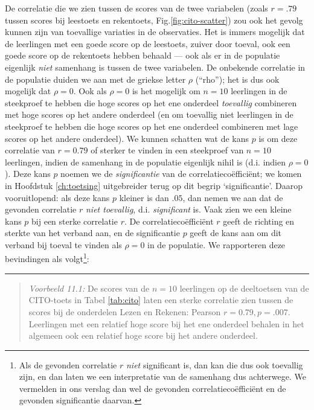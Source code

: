 \documentclass[
]{book}
\begin{document}
De correlatie die we zien tussen de scores van de twee variabelen (zoals
\(r=.79\) tussen scores bij leestoets en rekentoets,
Fig.\ref{fig:cito-scatter}) zou ook het gevolg kunnen zijn van
toevallige variaties in de observaties. Het is immers mogelijk dat de
leerlingen met een goede score op de leestoets, zuiver door toeval, ook
een goede score op de rekentoets hebben behaald --- ook als er in de
populatie eigenlijk \emph{niet} samenhang is tussen de twee variabelen. De
onbekende correlatie in de populatie duiden we aan met de griekse letter
\(\rho\) (``rho''); het is dus ook mogelijk dat \(\rho=0\). Ook als \(\rho=0\)
is het mogelijk om \(n=10\) leerlingen in de steekproef te hebben die hoge
scores op het ene onderdeel \emph{toevallig} combineren met hoge scores op
het andere onderdeel (en om toevallig niet leerlingen in de steekproef
te hebben die hoge scores op het ene onderdeel combineren met lage
scores op het andere onderdeel). We kunnen schatten wat de kans \(p\) is
om deze correlatie van \(r=0.79\) of sterker te vinden in een steekproef
van \(n=10\) leerlingen, indien de samenhang in de populatie eigenlijk
nihil is (d.i. indien \(\rho=0\)). Deze kans \(p\) noemen we de
\emph{significantie} van de correlatiecoëfficiënt; we komen in
Hoofdstuk \ref{ch:toetsing} uitgebreider terug op dit begrip
`significantie'. Daarop vooruitlopend: als deze kans \(p\) kleiner is dan
\(.05\), dan nemen we aan dat de gevonden correlatie \(r\) \emph{niet toevallig},
d.i. \emph{significant} is. Vaak zien we een kleine kans \(p\) bij een sterke
correlatie \(r\). De correlatiecoëfficiënt \(r\) geeft de richting en
sterkte van het verband aan, en de significantie \(p\) geeft de kans aan
om dit verband bij toeval te vinden als \(\rho=0\) in de populatie. We
rapporteren deze bevindingen als volgt\footnote{Als de gevonden correlatie \(r\) \emph{niet} significant is, dan kan die dus ook toevallig zijn, en dan laten we een interpretatie van de samenhang dus achterwege. We vermelden in ons verslag dan wel de gevonden correlatiecoëfficiënt en de gevonden significantie daarvan.}:

\begin{center}\rule{0.5\linewidth}{0.5pt}\end{center}

\begin{quote}
\emph{Voorbeeld 11.1:}
De scores van de \(n=10\) leerlingen op de deeltoetsen van de CITO-toets
in Tabel \ref{tab:cito} laten een sterke correlatie zien tussen de scores
bij de onderdelen Lezen en Rekenen: Pearson \(r=0.79, p=.007\). Leerlingen
met een relatief hoge score bij het ene onderdeel behalen in het
algemeen ook een relatief hoge score bij het andere onderdeel.
\end{quote}
\end{document}
